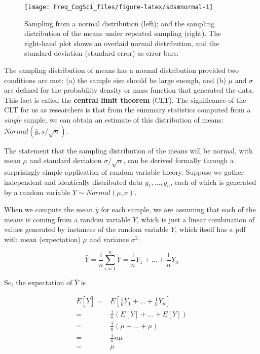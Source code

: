 \documentclass[12pt,]{krantz}
\begin{document}
\begin{figure}
\texttt{[image: Freq\_CogSci\_files/figure-latex/sdsmnormal-1]} \caption{Sampling from a normal distribution (left); and the sampling distribution of the means under repeated sampling (right). The right-hand plot shows an overlaid normal distribution, and the standard deviation (standard error) as error bars.}\label{fig:sdsmnormal}
\end{figure}

The sampling distribution of means has a normal distribution provided two conditions are met: (a) the sample size should be large enough, and (b) \(\mu\) and \(\sigma\) are defined for the probability density or mass function that generated the data. This fact is called the \textbf{central limit theorem} (CLT). The significance of the CLT for us as researchers is that from the summary statistics computed from a \emph{single} sample, we can obtain an estimate of this distribution of means: \(Normal(\bar{y},s/\sqrt{n})\).

The statement that the sampling distribution of the means will be normal, with mean \(\mu\) and standard deviation \(\sigma/\sqrt{n}\), can be derived formally through a surprisingly simple application of random variable theory. Suppose we gather independent and identically distributed data \(y_1, \dots, y_n\), each of which is generated by a random variable \(Y\sim Normal(\mu,\sigma)\).

When we compute the mean \(\bar{y}\) for each sample, we are assuming that each of the means is coming from a random variable \(\bar{Y}\), which is just a linear combination of values generated by instances of the random variable \(Y\), which itself has a pdf with mean (expectation) \(\mu\) and variance \(\sigma^2\):

\begin{equation}
\bar{Y}=\frac{1}{n} \sum_{i=1}^n Y = \frac{1}{n}Y_1 + \dots + \frac{1}{n}Y_n
 \end{equation}

So, the expectation of \(\bar{Y}\) is

\begin{equation}
\begin{split}
E[\bar{Y}] =& E[\frac{1}{n}Y_1 + \dots + \frac{1}{n}Y_n]\\
=& \frac{1}{n} (E[Y] + \dots + E[Y])\\
=& \frac{1}{n} (\mu + \dots + \mu)\\
=& \frac{1}{n} n\mu \\
=& \mu \\
\end{split}
\end{equation}
\end{document}
